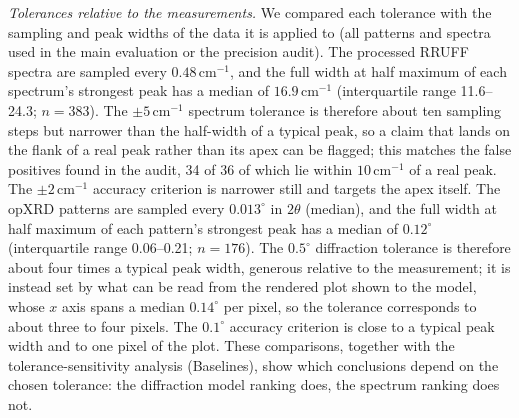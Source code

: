 \documentclass[pdflatex,sn-nature]{sn-jnl}
\newcommand{\rev}[1]{#1}
\newcommand{\rev}[1]{{\color{blue}#1}}
\begin{document}
\rev{\emph{Tolerances relative to the measurements.} We compared each tolerance with the sampling
and peak widths of the data it is applied to (all patterns and spectra used in the main evaluation
or the precision audit). The processed RRUFF spectra are sampled every $0.48\,\mathrm{cm}^{-1}$, and
the full width at half maximum of each spectrum's strongest peak has a median of
$16.9\,\mathrm{cm}^{-1}$ (interquartile range 11.6--24.3; $n=383$). The $\pm5\,\mathrm{cm}^{-1}$ spectrum
tolerance is therefore about ten sampling steps but narrower than the half-width of a typical peak,
so a claim that lands on the flank of a real peak rather than its apex can be flagged; this matches
the false positives found in the audit, 34 of 36 of which lie within $10\,\mathrm{cm}^{-1}$ of a real
peak. The $\pm2\,\mathrm{cm}^{-1}$ accuracy criterion is narrower still and targets the apex itself.
The opXRD patterns are sampled every $0.013^\circ$ in $2\theta$ (median), and the full width at half
maximum of each pattern's strongest peak has a median of $0.12^\circ$ (interquartile range 0.06--0.21;
$n=176$). The $0.5^\circ$ diffraction tolerance is therefore about four times a typical peak width,
generous relative to the measurement; it is instead set by what can be read from the rendered plot
shown to the model, whose $x$ axis spans a median $0.14^\circ$ per pixel, so the tolerance corresponds to
about three to four pixels. The $0.1^\circ$ accuracy criterion is close to a typical peak width and to
one pixel of the plot. These comparisons, together with the tolerance-sensitivity analysis (Baselines),
show which conclusions depend on the chosen tolerance: the diffraction model ranking does, the
spectrum ranking does not.}
\end{document}
